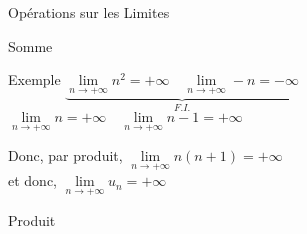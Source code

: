 \documentclass{cours}
\begin{document}
\begin{Gpartie}{Opérations sur les Limites}
\begin{Spartie}{Somme}
\begin{SSpartie}{Exemple}
                $\underbrace{\lim\limits_{n\to +\infty}n^2=+\infty\quad\lim\limits_{n\to +\infty}-n=-\infty}_{F.I.}$
                \qquad$\lim\limits_{n\to +\infty}n=+\infty\quad\lim\limits_{n\to +\infty}n-1=+\infty$

                Donc, par produit, $\lim\limits_{n\to +\infty}n(n+1)=+\infty$ \\ et donc, $\lim\limits_{n\to +\infty}u_n=+\infty$
            \end{SSpartie}
        \end{Spartie}
        \begin{Spartie}{Produit}
            \begin{table}[H] \centering {}
\end{table}
\end{Spartie}
\end{Gpartie}
\end{document}
